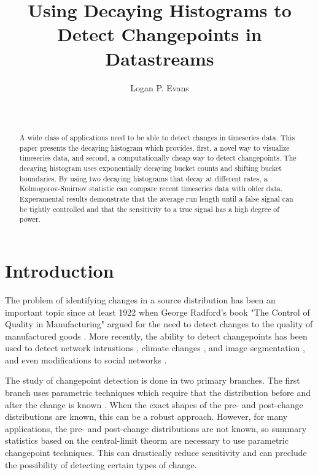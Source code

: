 \documentclass{sig-alternate}
\begin{document}
\title{Using Decaying Histograms to Detect Changepoints in Datastreams}


\author{
\alignauthor Logan P. Evans \\
       \\
       \\
}
\date{}
\maketitle
\begin{abstract}
    A wide class of applications need to be able to detect changes in timeseries
    data. This paper presents the decaying histogram which provides, first, a
    novel way to visualize timeseries data, and second, a computationally cheap
    way to detect changepoints. The decaying histogram uses exponentially
    decaying bucket counts and shifting bucket boundaries. By using two decaying
    histograms that decay at different rates, a Kolmogorov-Smirnov statistic can
    compare recent timeseries data with older data. Experamental results
    demonstrate that the average run length until a false signal can be tightly
    controlled and that the sensitivity to a true signal has a high degree of
    power.
\end{abstract}

\section{Introduction}
    The problem of identifying changes in a source distribution has been an
    important topic since at least 1922 when George Radford's book "The Control
    of Quality in Manufacturing" argued for the need to detect changes to the
    quality of manufactured goods \cite{radford1922control}. More recently, the
    ability to detect changepoints has been used to detect network intrustions
    \cite{tartakovsky2006novel}, climate changes \cite{reeves2007review},
    and image segmentation \cite{ranganathan2010pliss}, and even modifications
    to social networks \cite{mcculloh2011detecting}.

    The study of changepoint detection is done in two primary branches. The
    first branch uses parametric techniques which require that the distribution
    before and after the change is known \cite{polunchenko2012state}. When the
    exact shapes of the pre- and post-change distributions are known, this can
    be a robust approach. However, for many applications, the pre- and
    post-change distributions are not known, so summary statistics based on the
    central-limit theorm are necessary to use parametric changepoint techniques.
    This can drastically reduce sensitivity and can preclude the possibility of
    detecting certain types of change.
\end{document}

